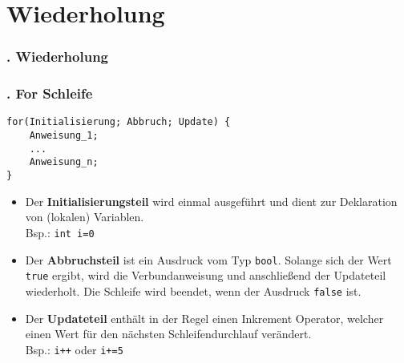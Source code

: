 \section{Wiederholung}
\begin{frame}
  \frametitle{\kap. Wiederholung}%
\tableofcontents[current]
\end{frame}

\def\stitle{For Schleife}
\begin{frame}[fragile]%
  \frametitle{\kap. \stitle}%

\begin{lstlisting}[style=java]
for(Initialisierung; Abbruch; Update) {
    Anweisung_1;
    ...
    Anweisung_n;
}
\end{lstlisting}
\begin{itemize}
\item Der \textbf{\textcolor{KITblue}{Initialisierungsteil}}  wird einmal ausgef\"uhrt und dient zur
    Deklaration von (lokalen) Variablen. \\ Bsp.: \lstinline|int i=0|
\item Der \textbf{\textcolor{KITblue}{Abbruchsteil}}  ist ein Ausdruck vom Typ
    \textcolor{KITgreen}{\lstinline|bool|}. Solange sich der Wert
    \textcolor{KITgreen}{\lstinline|true|} ergibt, wird die Verbundanweisung und
    anschlie\ss{}end der Updateteil wiederholt. Die Schleife wird beendet, wenn
    der Ausdruck \textcolor{KITgreen}{\lstinline|false|} ist.
\item Der \textbf{\textcolor{KITblue}{Updateteil}}  enth\"alt in der Regel einen Inkrement Operator, welcher einen Wert f\"ur den n\"achsten Schleifendurchlauf ver\"andert. \\ Bsp.: \lstinline|i++| oder \lstinline|i+=5|
\end{itemize}
\end{frame}
